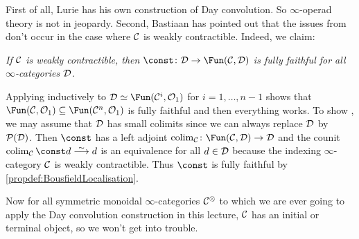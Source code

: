 \label{par:DontWorry}
First of all, Lurie \cite[Subsection~2.2.6]{HA} has his own construction of Day convolution. So $\infty$-operad theory is not in jeopardy. Second, Bastiaan has pointed out that the issues from  don't occur in the case where $\mathcal{C}$ is weakly contractible. Indeed, we claim:
\begin{alphanumerate}
 	\item[\itememph{\boxtimes}] \itshape If $\mathcal{C}$ is weakly contractible, then $\const\colon \Dd\morphism \Fun(\Cc,\Dd)$ is fully faithful for all $\infty$-categories $\mathcal{D}$.
\end{alphanumerate}
Applying \itememph{\boxtimes} inductively to $\Dd\simeq \Fun(\Cc^i,\Oo_1)$ for $i=1,\dotsc,n-1$ shows that $\Fun(\Cc,\Oo_1)\subseteq \Fun(\Cc^n,\Oo_1)$ is fully faithful and then everything works. To show \itememph{\boxtimes}, we may assume that $\mathcal{D}$ has small colimits since we can always replace $\mathcal{D}$ by $\mathcal{P}(\mathcal{D})$. Then $\const$ has a left adjoint $\colimit_\Cc\colon \Fun(\Cc,\Dd)\morphism \Dd$ and the counit $\colimit_\Cc\const d\isomorphism d$ is an equivalence for all $d\in \mathcal{D}$ because the indexing $\infty$-category $\mathcal{C}$ is weakly contractible. Thus $\const$ is fully faithful by \cref{propdef:BousfieldLocalisation}.

Now for all symmetric monoidal $\infty$-categories $\mathcal{C}^\otimes$ to which we are ever going to apply the Day convolution construction in this lecture, $\mathcal{C}$ has an initial or terminal object, so we won't get into trouble.


